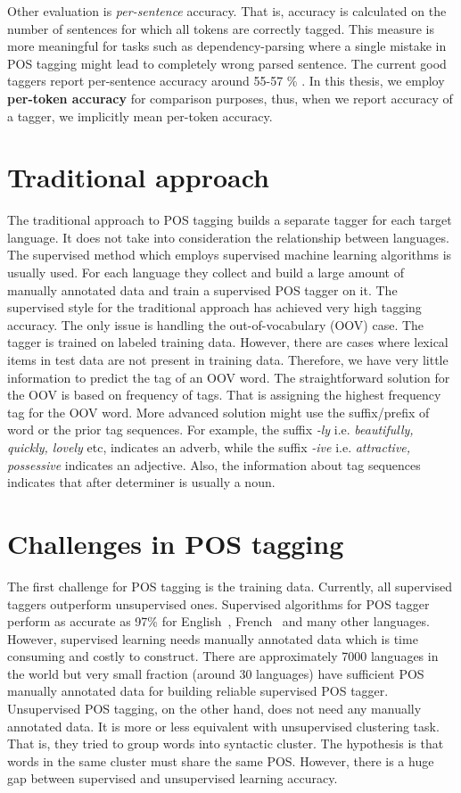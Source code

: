 Other evaluation is \emph{per-sentence} accuracy. That is, accuracy is calculated on the number of sentences for which all tokens are correctly tagged. This measure is more meaningful for tasks such as dependency-parsing where a single mistake in POS tagging might lead to completely wrong parsed sentence. The current good taggers report per-sentence accuracy around 55-57 \% \cite{Manning:2011:100}. 
In this thesis, we employ \textbf{per-token accuracy} for comparison purposes, thus, when we report accuracy of a tagger, we implicitly mean per-token accuracy. 

\section{Traditional approach}
The traditional approach to POS tagging builds a separate tagger for each target language. It does not take into consideration the relationship between languages. The supervised method which employs supervised machine learning algorithms is usually used. For each language they collect and build a large amount of manually annotated data and train a supervised POS tagger on it. The supervised style for the traditional approach has achieved very high tagging accuracy. The only issue is handling the out-of-vocabulary (OOV) case. The tagger is trained on labeled training data. However, there are cases where lexical items in test data are not present in training data. Therefore, we have very little information to predict the tag of an OOV word. The straightforward solution for the OOV is based on frequency of tags. That is assigning the highest frequency tag for the OOV word. More advanced solution might use the suffix/prefix of word or the prior tag sequences. For example, the suffix \textit{-ly} i.e. \textit{beautifully, quickly, lovely} etc, indicates an adverb, while the suffix \textit{-ive} i.e. \textit{attractive, possessive} indicates an adjective. Also, the information about tag sequences indicates that after determiner is usually a noun. 

\section{Challenges in POS tagging}
The first challenge for POS tagging is the training data. Currently, all supervised taggers outperform unsupervised ones. Supervised algorithms for POS tagger perform as accurate as 97\% for English~\cite{maximumEntropy}, French~\cite{denis:inria-00614819} and many other languages. However, supervised learning needs manually annotated data which is time consuming and costly to construct. There are approximately 7000 languages in the world but very small fraction (around 30 languages) have sufficient POS manually annotated data for building reliable supervised POS tagger. Unsupervised POS tagging, on the other hand, does not need any manually annotated data. It is more or less equivalent with unsupervised clustering task. That is, they tried to group words into syntactic cluster. The hypothesis is that words in the same cluster must share the same POS. However, there is a huge gap between supervised and unsupervised learning accuracy.  

